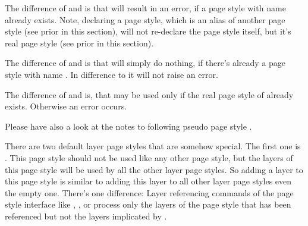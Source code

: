 \begin{desclist}
{  }%
\end{desclist}

The difference of  and
 is that
 will result in an error, if a page style
with name  already exists. Note, declaring a page
style, which is an alias of another page style (see
 prior in this section), will not re-declare the
page style itself, but it's real page style (see
 prior in this section).

The difference of  and
 is that 
will simply do nothing, if there's already a page style with name . In difference to  it will not
raise an error.

The difference of  and
 is, that 
may be used only if the real page style of  already
exists. Otherwise an error occurs.

Please have also a look at the notes to following pseudo page style
.%
\EndIndexGroup


\begin{Declaration}
\end{Declaration}
There are two default layer page styles that are somehow special. The first
one is . This page style should not be used like any
other page style, but the layers of this page style will be used by all the
other layer page styles. So adding a layer to this page style is similar to
adding this layer to all other layer page styles even the empty one. There's
one difference: Layer referencing commands of the page style interface like
,
, or
 process only the
layers of the page style that has been referenced but not the layers
implicated by .


